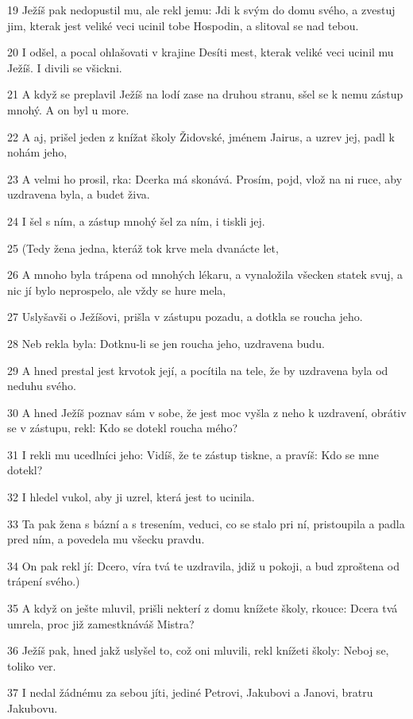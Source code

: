 \par 19 Ježíš pak nedopustil mu, ale rekl jemu: Jdi k svým do domu svého, a zvestuj jim, kterak jest veliké veci ucinil tobe Hospodin, a slitoval se nad tebou.
\par 20 I odšel, a pocal ohlašovati v krajine Desíti mest, kterak veliké veci ucinil mu Ježíš. I divili se všickni.
\par 21 A když se preplavil Ježíš na lodí zase na druhou stranu, sšel se k nemu zástup mnohý. A on byl u more.
\par 22 A aj, prišel jeden z knížat školy Židovské, jménem Jairus, a uzrev jej, padl k nohám jeho,
\par 23 A velmi ho prosil, rka: Dcerka má skonává. Prosím, pojd, vlož na ni ruce, aby uzdravena byla, a budet živa.
\par 24 I šel s ním, a zástup mnohý šel za ním, i tiskli jej.
\par 25 (Tedy žena jedna, kteráž tok krve mela dvanácte let,
\par 26 A mnoho byla trápena od mnohých lékaru, a vynaložila všecken statek svuj, a nic jí bylo neprospelo, ale vždy se hure mela,
\par 27 Uslyšavši o Ježíšovi, prišla v zástupu pozadu, a dotkla se roucha jeho.
\par 28 Neb rekla byla: Dotknu-li se jen roucha jeho, uzdravena budu.
\par 29 A hned prestal jest krvotok její, a pocítila na tele, že by uzdravena byla od neduhu svého.
\par 30 A hned Ježíš poznav sám v sobe, že jest moc vyšla z neho k uzdravení, obrátiv se v zástupu, rekl: Kdo se dotekl roucha mého?
\par 31 I rekli mu ucedlníci jeho: Vidíš, že te zástup tiskne, a pravíš: Kdo se mne dotekl?
\par 32 I hledel vukol, aby ji uzrel, která jest to ucinila.
\par 33 Ta pak žena s bázní a s tresením, veduci, co se stalo pri ní, pristoupila a padla pred ním, a povedela mu všecku pravdu.
\par 34 On pak rekl jí: Dcero, víra tvá te uzdravila, jdiž u pokoji, a bud zproštena od trápení svého.)
\par 35 A když on ješte mluvil, prišli nekterí z domu knížete školy, rkouce: Dcera tvá umrela, proc již zamestknáváš Mistra?
\par 36 Ježíš pak, hned jakž uslyšel to, což oni mluvili, rekl knížeti školy: Neboj se, toliko ver.
\par 37 I nedal žádnému za sebou jíti, jediné Petrovi, Jakubovi a Janovi, bratru Jakubovu.
